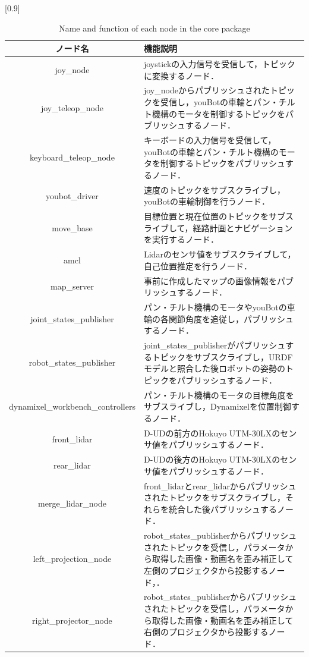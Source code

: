 \documentclass[12pt]{sonota/aislab}
\begin{document}
\begin{table}[t]
\begin{center}
\caption{Name and function of each node in the core package}
\label{table:ros_node}
\scalebox{0.9}[0.9]{
  \begin{tabular}{|c|p{8cm}|}\hline
   ノード名 & 機能説明 \\\hline
   joy\_node & joystickの入力信号を受信して，トピックに変換するノード． \\ \hline
   joy\_teleop\_node & joy\_nodeからパブリッシュされたトピックを受信し，youBotの車輪とパン・チルト機構のモータを制御するトピックをパブリッシュするノード． \\ \hline
   keyboard\_teleop\_node & キーボードの入力信号を受信して，youBotの車輪とパン・チルト機構のモータを制御するトピックをパブリッシュするノード． \\ \hline
   youbot\_driver & 速度のトピックをサブスクライブし，youBotの車輪制御を行うノード． \\ \hline
   move\_base & 目標位置と現在位置のトピックをサブスライブして，経路計画とナビゲーションを実行するノード． \\ \hline
   amcl & Lidarのセンサ値をサブスクライブして，自己位置推定を行うノード． \\ \hline
   map\_server & 事前に作成したマップの画像情報をパブリッシュするノード． \\ \hline
   joint\_states\_publisher & パン・チルト機構のモータやyouBotの車輪の各関節角度を追従し，パブリッシュするノード． \\ \hline
   robot\_states\_publisher & joint\_states\_publisherがパブリッシュするトピックをサブスクライブし，URDFモデルと照合した後ロボットの姿勢のトピックをパブリッシュするノード． \\ \hline
   dynamixel\_workbench\_controllers & パン・チルト機構のモータの目標角度をサブスライブし，Dynamixelを位置制御するノード． \\ \hline
   front\_lidar & D-UDの前方のHokuyo UTM-30LXのセンサ値をパブリッシュするノード． \\ \hline
   rear\_lidar & D-UDの後方のHokuyo UTM-30LXのセンサ値をパブリッシュするノード． \\ \hline
   merge\_lidar\_node & front\_lidarとrear\_lidarからパブリッシュされたトピックをサブスクライブし，それらを統合した後パブリッシュするノード． \\ \hline
   left\_projection\_node & robot\_states\_publisherからパブリッシュされたトピックを受信し，パラメータから取得した画像・動画名を歪み補正して左側のプロジェクタから投影するノード，． \\ \hline
   right\_projector\_node & robot\_states\_publisherからパブリッシュされたトピックを受信し，パラメータから取得した画像・動画名を歪み補正して右側のプロジェクタから投影するノード． \\ \hline

  \end{tabular}
}
  \end{center}
\end{table}
\end{document}
